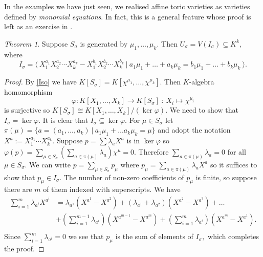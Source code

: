 \documentclass[BSc]{usydthesis}
\numberwithin{equation}{chapter}
\theoremstyle{remark}
\newtheorem{Theorem}[equation]{Theorem}
\begin{document}
In the examples we have just seen, we realised affine toric varieties as varieties defined by {\em monomial equations}. In fact, this is a general feature whose proof is left as an exercise in \cite[Page.~ 19]{Fulton:Toric}. 

\begin{Theorem}\label{Monomial} Suppose $S_{\sigma}$ is generated by $\mu_1, \ldots, \mu_k.$ Then $U_{\sigma} = V(I_{\sigma}) \subseteq K^k,$ where $$ I_{\sigma} = \langle \  X_1^{a_1} X_2^{a_2} \cdots X_k^{a_k} - X_1^{b_1} X_2^{b_2} \cdots X_k^{b_k} \  \big| \  a_1 \mu_1 + \ldots +a_k \mu_k = b_1 \mu_1 + \ldots + b_k \mu_k \ \rangle.$$
\end{Theorem}

\begin{proof}
 By \ref{Iso} we have $K[S_{\sigma}] = K[\chi^{\mu_1}, \ldots, \chi^{\mu_k}].$ Then $K$-algebra homomorphism $$\varphi: K[X_1,\ldots, X_k] \to K[S_{\sigma}] \ : \ X_i\mapsto \chi^{\mu_i}$$ is surjective so $K[S_{\sigma}] \cong K[X_1,\ldots, X_k]/(\ker \varphi).$ We need to show that $I_{\sigma} = \ker \varphi.$ It is clear that $I_{\sigma}\subseteq \ker \varphi.$ For $\mu \in S_{\sigma}$ let $\pi(\mu) = \{ a=(a_1,\ldots, a_k) \ | \ a_1 \mu_1 + \ldots a_k \mu_k = \mu \}$ and adopt the notation $X^a := X_1^{a_1} \cdots X_k^{a_k}.$ Suppose $p= \sum \lambda_a X^a$ is in $\ker \varphi$ so $\displaystyle \varphi(p) = \sum_{\mu \in S_{\sigma}} \left( \sum_{a\in \pi(\mu) } \lambda_a \right) \chi^{\mu}=0.$ Therefore $\displaystyle \sum_{a\in \pi(\mu)} \lambda_a =0$ for all $\mu \in S_{\sigma}.$ We can write $\displaystyle p=\sum_{\mu \in S_{\sigma}} p_{\mu}$ where $\displaystyle p_{\mu} = \sum_{a\in\pi(\mu)} \lambda_a X^a$ so it suffices to show that $p_{\mu} \in I_{\sigma}.$ The number of non-zero coefficients of $p_{\mu}$ is finite, so suppose there are $m$ of them indexed with superscripts. We have 
 \begin{align*}
   \sum_{i=1}^m \lambda_{a^i} X^{a^i} &= \lambda_{a^1} ( X^{a^1} - X^{a^2} ) + (\lambda_{a^1} + \lambda_{a^2} ) (X^{a^2} -X^{a^3}) + \ldots\\
   &  +\left(\sum_{i=1}^{m-1} \lambda_{a^i}\right) ( X^{a^{m-1}} - X^{a^m} ) + \left(\sum_{i=1}^{m} \lambda_{a^i}\right)( X^{a^m} - X^{a^1}). \\
 \end{align*}
Since $\displaystyle \sum_{i=1}^{m} \lambda_{a^i}=0$ we see that $p_{\mu}$ is the sum of elements of $I_{\sigma},$ which completes the proof.
\end{proof}
\end{document}
